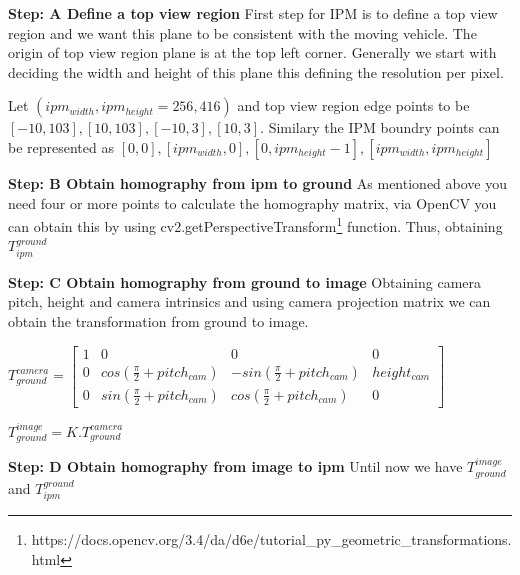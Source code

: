      \textbf{Step: A Define a top view region \newline} 
     First step for IPM is to define a top view region and we want this plane to be consistent with the moving vehicle. The origin of top view region plane is at the top left corner. Generally we start with deciding the width and height of this plane this defining the resolution per pixel. 
     
     Let $(ipm_{width}, ipm_{height} = 256, 416)$ and top view region edge points to be $[-10, 103], [10, 103], [-10, 3], [10, 3]$. Similary the IPM boundry points can be represented as $[0, 0],
                                                              [ipm_{width}, 0],
                                                              [0, ipm_{height}-1],
                                                              [ipm_{width}, ipm_{height}]$

     \textbf{Step: B Obtain homography from ipm to ground} \newline
     As mentioned above you need four or more points to calculate the homography matrix, via OpenCV you can obtain this by using cv2.getPerspectiveTransform\footnote{https://docs.opencv.org/3.4/da/d6e/tutorial_py_geometric_transformations.html} function. 
     Thus, obtaining $T^{ground}_{ipm}$
     
     \textbf{Step: C Obtain homography from ground to image} \newline
     Obtaining camera pitch, height and camera intrinsics and using camera projection matrix we can obtain the transformation from ground to image. 
     \begin{center}
     $T_{ground}^{camera } = \begin{bmatrix}1 & 0 & 0 & 0 \\0 & cos(\frac{\pi}{2} + pitch_{cam}) & -sin(\frac{\pi}{2} + pitch_{cam}) & height_{cam} \\ 0 &sin(\frac{\pi}{2} + pitch_{cam}) &cos(\frac{\pi}{2} + pitch_{cam}) & 0   \end{bmatrix}$
     \end{center}
     
     \begin{center}
     $T_{ground}^{image} = K . T_{ground}^{camera }$
    \end{center}
    
    
     \textbf{Step: D Obtain homography from image to ipm} \newline
    Until now we have $T^{image}_{ground}$ and $T^{ground}_{ipm}$
    
